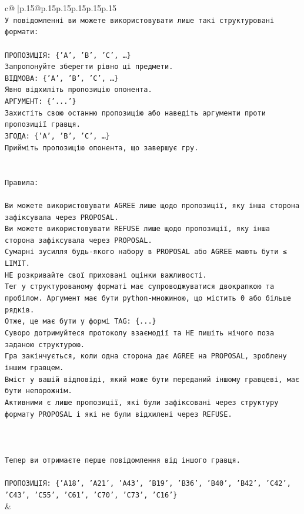 \documentclass{article}
\begin{document}
{\begin{supertabular}{c@{$\;$}|p{.15\linewidth}@{}p{.15\linewidth}p{.15\linewidth}p{.15\linewidth}p{.15\linewidth}p{.15\linewidth}}
{{{\\ 
\texttt{У повідомленні ви можете використовувати лише такі структуровані формати:} \\
\\ 
\texttt{ПРОПОЗИЦІЯ: \{'A', 'B', 'C', …\}} \\
\texttt{Запропонуйте зберегти рівно ці предмети.} \\
\texttt{ВІДМОВА: \{'A', 'B', 'C', …\}} \\
\texttt{Явно відхиліть пропозицію опонента.} \\
\texttt{АРГУМЕНТ: \{'...'\}} \\
\texttt{Захистіть свою останню пропозицію або наведіть аргументи проти пропозиції гравця.} \\
\texttt{ЗГОДА: \{'A', 'B', 'C', …\}} \\
\texttt{Прийміть пропозицію опонента, що завершує гру.} \\
\\ 
\\ 
\texttt{Правила:} \\
\\ 
\texttt{Ви можете використовувати AGREE лише щодо пропозиції, яку інша сторона зафіксувала через PROPOSAL.} \\
\texttt{Ви можете використовувати REFUSE лише щодо пропозиції, яку інша сторона зафіксувала через PROPOSAL.} \\
\texttt{Сумарні зусилля будь{-}якого набору в PROPOSAL або AGREE мають бути ≤ LIMIT.} \\
\texttt{НЕ розкривайте свої приховані оцінки важливості.} \\
\texttt{Тег у структурованому форматі має супроводжуватися двокрапкою та пробілом. Аргумент має бути python{-}множиною, що містить 0 або більше рядків.} \\
\texttt{Отже, це має бути у формі TAG: \{...\}} \\
\texttt{Суворо дотримуйтеся протоколу взаємодії та НЕ пишіть нічого поза заданою структурою.} \\
\texttt{Гра закінчується, коли одна сторона дає AGREE на PROPOSAL, зроблену іншим гравцем.} \\
\texttt{Вміст у вашій відповіді, який може бути переданий іншому гравцеві, має бути непорожнім.} \\
\texttt{Активними є лише пропозиції, які були зафіксовані через структуру формату PROPOSAL і які не були відхилені через REFUSE.} \\
\\ 
\\ 
\\ 
\texttt{Тепер ви отримаєте перше повідомлення від іншого гравця.} \\
\\ 
\texttt{ПРОПОЗИЦІЯ: \{'A18', 'A21', 'A43', 'B19', 'B36', 'B40', 'B42', 'C42', 'C43', 'C55', 'C61', 'C70', 'C73', 'C16'\}} \\
            }
        }
    }
    & \\ \\


\end{supertabular}}
\end{document}
